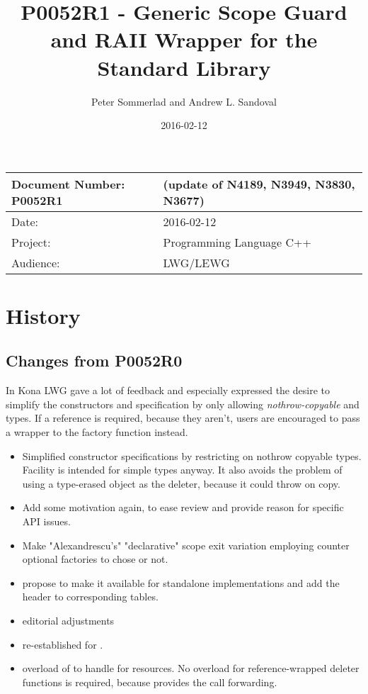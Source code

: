 \documentclass[ebook,11pt,article]{memoir}
\title{P0052R1 - Generic Scope Guard and RAII Wrapper for the Standard Library}
\author{Peter Sommerlad and Andrew L. Sandoval}
\date{2016-02-12}                        %
\begin{document}
\maketitle
\begin{tabular}[t]{|l|l|}\hline 
Document Number: P0052R1 &   (update of N4189, N3949, N3830, N3677)\\\hline
Date: & 2016-02-12 \\\hline
Project: & Programming Language C++\\\hline 
Audience: & LWG/LEWG\\\hline
\end{tabular}

\chapter{History}

\section{Changes from P0052R0}
In Kona LWG gave a lot of feedback and especially expressed the desire to simplify the constructors and specification by only allowing \emph{nothrow-copyable}  and  types. If a reference is required, because they aren't, users are encouraged to pass a  wrapper to the factory function instead.
\begin{itemize}
\item Simplified constructor specifications by restricting on nothrow copyable types. Facility is intended for simple types anyway. It also avoids the problem of using a type-erased  object as the deleter, because it could throw on copy.
\item Add some motivation again, to ease review and provide reason for specific API issues.
\item Make "Alexandrescu's" "declarative" scope exit variation employing  counter optional factories to chose or not.
\item propose to make it available for standalone implementations and add the header  to corresponding tables.
\item editorial adjustments
\item re-established  for .
\item overload of  to handle  for resources. No overload for reference-wrapped deleter functions is required, because  provides the call forwarding.
\end{itemize}
\end{document}
